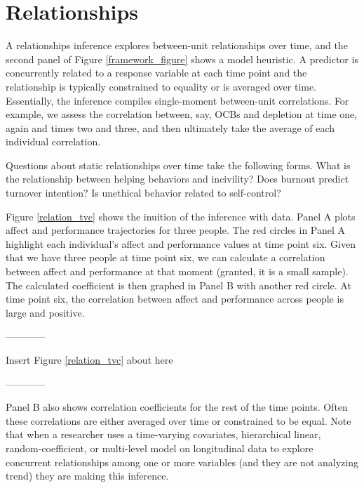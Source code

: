 \documentclass[english,,man]{apa6}
\theoremstyle{definition}
\theoremstyle{definition}
\theoremstyle{definition}
\theoremstyle{remark}
\begin{document}
\hypertarget{relationships}{%
\section{Relationships}\label{relationships}}

A relationships inference explores between-unit relationships over time,
and the second panel of Figure \ref{framework_figure} shows a model
heuristic. A predictor is concurrently related to a response variable at
each time point and the relationship is typically constrained to
equality or is averaged over time. Essentially, the inference compiles
single-moment between-unit correlations. For example, we assess the
correlation between, say, OCBs and depletion at time one, again and
times two and three, and then ultimately take the average of each
individual correlation.

Questions about static relationships over time take the following forms.
What is the relationship between helping behaviors and incivility? Does
burnout predict turnover intention? Is unethical behavior related to
self-control?

Figure \ref{relation_tvc} shows the inuition of the inference with data.
Panel A plots affect and performance trajectories for three people. The
red circles in Panel A highlight each individual's affect and
performance values at time point six. Given that we have three people at
time point six, we can calculate a correlation between affect and
performance at that moment (granted, it is a small sample). The
calculated coefficient is then graphed in Panel B with another red
circle. At time point six, the correlation between affect and
performance across people is large and positive.

\begin{center}

------------

Insert Figure \ref{relation_tvc} about here

------------

\end{center}

Panel B also shows correlation coefficients for the rest of the time
points. Often these correlations are either averaged over time or
constrained to be equal. Note that when a researcher uses a time-varying
covariates, hierarchical linear, random-coefficient, or multi-level
model on longitudinal data to explore concurrent relationships among one
or more variables (and they are not analyzing trend) they are making
this inference.
\end{document}
